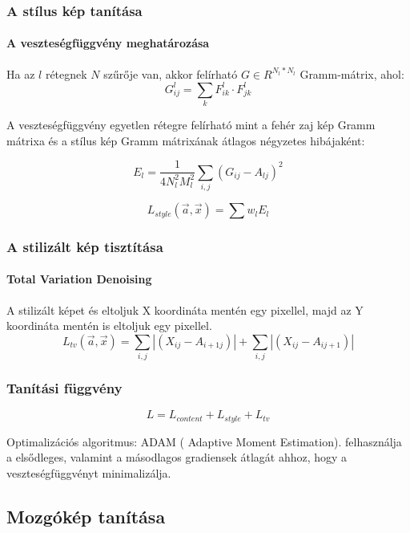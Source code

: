 \documentclass{beamer}
\begin{document}
	\begin{frame}
		\frametitle{A stílus kép tanítása}
		\framesubtitle{A veszteségfüggvény meghatározása}
		
		Ha az \(l\) rétegnek \(N\) szűrője van, akkor felírható \(G \in R^{N_l*N_l}\) Gramm-mátrix, ahol:
		\begin{equation}
			G^l_{ij} = \sum_{k} F^l_{ik} \cdot F^l_{jk}
		\end{equation}
		
		A veszteségfüggvény egyetlen rétegre felírható mint a fehér zaj kép Gramm mátrixa és a stílus kép Gramm mátrixának átlagos négyzetes hibájaként:
		 
		\begin{equation}
			E_l = \frac{1}{4N^2_l M^2_l} \sum_{i,j} (G_{ij} - A_{lj})^2
		\end{equation}
		
		\begin{equation}
			L_{style}(\vec{a}, \vec{x}) = \sum w_lE_l
		\end{equation}
		
	\end{frame}

	\begin{frame}
		\frametitle{A stilizált kép tisztítása}
		\framesubtitle{Total Variation Denoising}
		
		A stilizált képet és eltoljuk X koordináta mentén egy pixellel, majd az Y koordináta mentén is eltoljuk egy pixellel.
		\begin{equation}
			L_{tv}(\vec{a}, \vec{x}) = \sum_{i,j} \left|(X_{ij} - A_{{i+1}j})\right| + \sum_{i, j} \left|(X_{ij} - A_{i {j+1}})\right|
		\end{equation}
	\end{frame}

	\begin{frame}
		\frametitle{Tanítási függvény}
		
		\begin{equation}
			L = L_{content} + L_{style} + L_{tv}
		\end{equation}
		
		Optimalizációs algoritmus: ADAM ( Adaptive Moment Estimation). felhasználja a elsődleges, valamint a másodlagos gradiensek átlagát ahhoz, hogy a veszteségfüggvényt minimalizálja.
		
	\end{frame}

	\subsection{Mozgókép tanítása}
	
\end{document}
